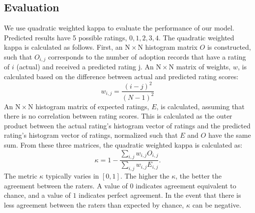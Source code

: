 \subsection{Evaluation}
We use quadratic weighted kappa to evaluate the performance of our model. Predicted results have 5 possible ratings, $0,1,2,3,4$. The quadratic weighted kappa is calculated as follows. First, an $\mathrm{N} \times \mathrm{N}$ histogram matrix $O$ is constructed, such that $O_{i, j}$ corresponds to the number of adoption records that have a rating of $i$ (actual) and received a predicted rating j. An $\mathrm{N}\times \mathrm{N}$ matrix of weights, $w$, is calculated based on the difference between actual and predicted rating scores:
$$
w_{i, j}=\frac{(i-j)^2}{(N-1)^2}
$$
An $\mathrm{N}\times \mathrm{N}$ histogram matrix of expected ratings, $E$, is calculated, assuming that there is no correlation between rating scores. This is calculated as the outer product between the actual rating's histogram vector of ratings and the predicted rating's histogram vector of ratings, normalized such that $E$ and $O$ have the same sum.
From these three matrices, the quadratic weighted kappa is calculated as:
$$
\kappa=1-\frac{\sum_{i, j} w_{i, j} O_{i, j}}{\sum_{i, j} w_{i, j} E_{i, j}}.
$$  
The metric $\kappa$ typically varies in $[0,1]$. The higher the $\kappa$, the better the agreement between the raters. A value of $0$ indicates agreement equivalent to chance, and a value of $1$ indicates perfect agreement. In the event that there is less agreement between the raters than expected by chance, $\kappa$ can be negative.